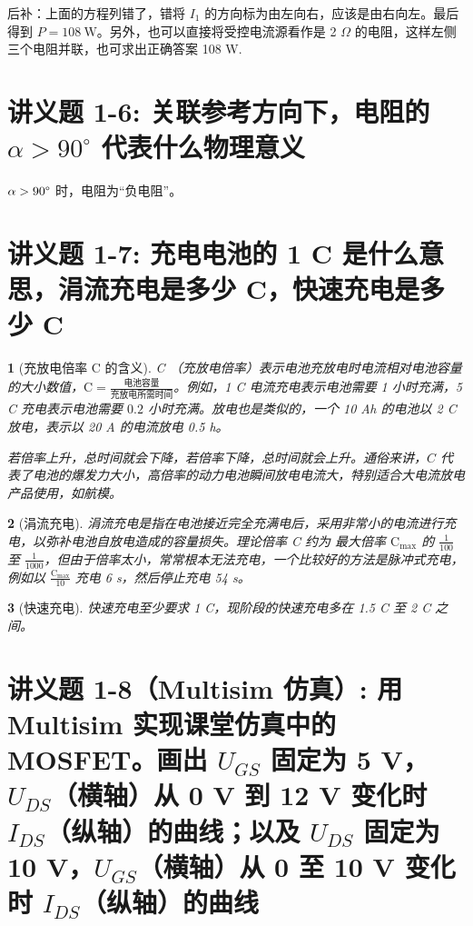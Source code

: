 \documentclass[UTF8]{report}
\theoremstyle{MyLineTheoremStyle} %
\theoremstyle{MyBlockTheoremStyle} %
\theoremstyle{MySubsubsectionStyle} %
\newtheorem{definition}{}
\begin{document}
{\par\color{gray}\small
后补：上面的方程列错了，错将 $I_1$ 的方向标为由左向右，应该是由右向左。最后得到 $P = 108\ \mathrm{W}$。另外，也可以直接将受控电流源看作是 2 $\Omega$ 的电阻，这样左侧三个电阻并联，也可求出正确答案 108 W.
\par}


\section{讲义题 1-6: 关联参考方向下，电阻的 $\alpha > 90^\circ$ 代表什么物理意义}

$\alpha > 90 \text{\textdegree}$ 时，电阻为“负电阻”。

\section{讲义题 1-7: 充电电池的 1 C 是什么意思，涓流充电是多少 C，快速充电是多少 C}


\begin{definition}[充放电倍率 C 的含义]
C （充放电倍率）表示电池充放电时电流相对电池容量的大小数值，$\mathrm{C} = \frac{\text{电池容量}}{\text{充放电所需时间}}$。例如，1 C 电流充电表示电池需要 1 小时充满，5 C 充电表示电池需要 $0.2$ 小时充满。放电也是类似的，一个 10 Ah 的电池以 2 C 放电，表示以 20 A 的电流放电 0.5 h。 \par
若倍率上升，总时间就会下降，若倍率下降，总时间就会上升。通俗来讲，$C$ 代表了电池的爆发力大小，高倍率的动力电池瞬间放电电流大，特别适合大电流放电产品使用，如航模。
\end{definition}


\begin{definition}[涓流充电]
涓流充电是指在电池接近完全充满电后，采用非常小的电流进行充电，以弥补电池自放电造成的容量损失。理论倍率 C 约为 最大倍率 $\mathrm{C_{max}}$ 的 $\frac{1}{100}$ 至 $\frac{1}{1000}$，但由于倍率太小，常常根本无法充电，一个比较好的方法是脉冲式充电，例如以 $\frac{\mathrm{C_{max}}}{10}$ 充电 6 s，然后停止充电 54 s。
\end{definition}


\begin{definition}[快速充电]
快速充电至少要求 1 C，现阶段的快速充电多在 1.5 C 至 2 C 之间。
\end{definition}


\section{讲义题 1-8（Multisim 仿真）: 用 Multisim 实现课堂仿真中的 MOSFET。画出 $U_{GS}$ 固定为 5 V，$U_{DS}$（横轴）从 0 V 到 12 V 变化时 $I_{DS}$（纵轴）的曲线；以及 $U_{DS}$ 固定为 10 V，$U_{GS}$（横轴）从 0 至 10 V 变化时 $I_{DS}$（纵轴）的曲线}
\end{document}
